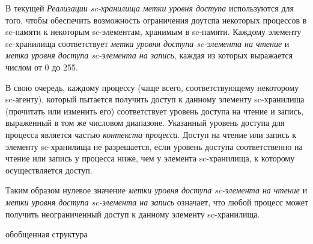 В текущей \textit{Реализации sc-хранилища} \textit{метки уровня доступа} используются для того, чтобы обеспечить
возможность ограничения доутспа некоторых процессов в sc-памяти к некоторым sc-элементам, хранимым в sc-памяти.
Каждому элементу sc-хранилища соответствует \textit{метка уровня доступа sc-элемента на чтение} и \textit{метка уровня
доступа sc-элемента на запись}, каждая из которых выражается числом от 0 до 255.

В свою очередь, каждому процессу (чаще всего, соответствующему некоторому sc-агенту), который пытается получить доступ к
данному элементу sc-хранилища (прочитать или изменить его) соответствует уровень доступа на чтение и запись, выраженный
в том же числовом диапазоне. Указанный уровень доступа для процесса является частью \textit{контекста процесса}. Доступ
на чтение или запись к элементу sc-хранилища не разрешается, если уровень доступа соответственно на чтение или запись
у процесса ниже, чем у элемента sc-хранилища, к которому осуществляется доступ.

Таким образом нулевое значение \textit{метки уровня доступа sc-элемента на чтение} и \textit{метки уровня доступа
sc-элемента на запись} означает, что любой процесс может получить неограниченный доступ к данному элементу sc-хранилища.

\begin{SCn}
\begin{scnrelfromset}{обобщенная структура}
\end{scnrelfromset}
\end{SCn}


